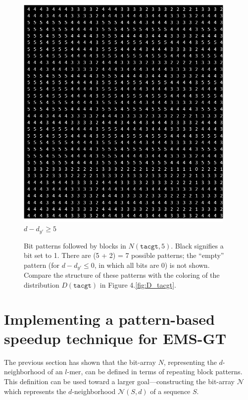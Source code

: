 \documentclass[oneside,12pt]{DISCSthesis}
\begin{document}
{\begin{figure}[h]
				\begin{minipage}{.33\textwidth} \centering \includegraphics[width=0.95\textwidth]{img/5} $d-d_{y'} \geq 5$ \end{minipage}
				\newline\newline
				\caption{
					Bit patterns followed by blocks in $N(\texttt{tacgt}, 5)$. Black signifies a bit set to 1. There are (5 + 2) = 7 possible patterns; the ``empty'' pattern (for $d - d_{y'} \leq 0$, in which all bits are 0) is not shown. Compare the structure of these patterns with the coloring of the distribution $D(\texttt{tacgt})$ in Figure 4.\ref{fig:D_tacgt}.
					}
			\end{figure}
		\newpage
	


	\newpage
	\section{Implementing a pattern-based speedup technique for EMS-GT}
	The previous section has shown that the bit-array $N$, representing the $d$-neighborhood of an $l$-mer, can be defined in terms of repeating block patterns. This definition can be used toward a larger goal---constructing the bit-array $\mathcal{N}$ which represents the $d$-neighborhood $\mathcal{N}(S,d)$ of a sequence $S$.

}
\end{document}
